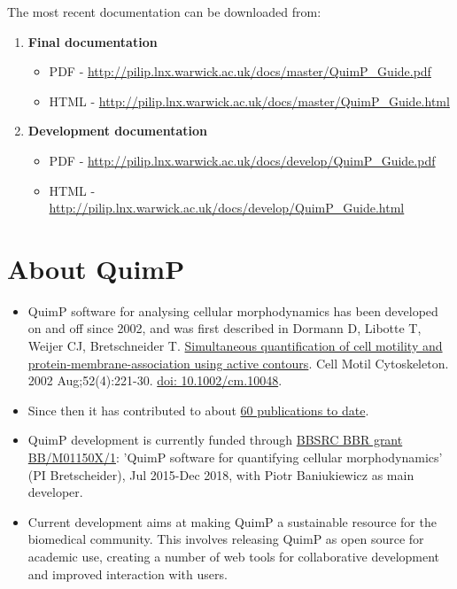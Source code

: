\documentclass[a4paper,12pt]{article}
\begin{document}
The most recent documentation can be downloaded from:
\begin{enumerate}
	\item \textbf{Final documentation}
	\begin{itemize}
		\item PDF - \url{http://pilip.lnx.warwick.ac.uk/docs/master/QuimP_Guide.pdf}
		\item HTML - \url{http://pilip.lnx.warwick.ac.uk/docs/master/QuimP_Guide.html}
	\end{itemize}
	\item \textbf{Development documentation}
	\begin{itemize}
		\item PDF - \url{http://pilip.lnx.warwick.ac.uk/docs/develop/QuimP_Guide.pdf}
		\item HTML - \url{http://pilip.lnx.warwick.ac.uk/docs/develop/QuimP_Guide.html}
	\end{itemize}
\end{enumerate} 
\section{About QuimP}
	\begin{itemize}
	\item QuimP software for analysing cellular morphodynamics has been developed on and off since 2002, and was first described in
Dormann D, Libotte T, Weijer CJ, Bretschneider T. \href{https://www.ncbi.nlm.nih.gov/pubmed/12112136}{Simultaneous quantification of cell motility and protein-membrane-association using active contours}. Cell Motil Cytoskeleton. 2002 Aug;52(4):221-30. \href{http://dx.doi.org/10.1007/978-3-0348-8043-5_17}{doi: 10.1002/cm.10048}.
	\item Since then it has contributed to about \href{http://www2.warwick.ac.uk/fac/sci/systemsbiology/staff/baniukiewicz/quimp/quimp-refs/}{60 publications to date}.
	\item QuimP development is currently funded through \href{http://www.bbsrc.ac.uk/research/grants-search/AwardDetails/?FundingReference=BB/M01150X/1}{BBSRC BBR grant BB/M01150X/1}: 'QuimP software for quantifying cellular morphodynamics' (PI Bretscheider), Jul 2015-Dec 2018, with Piotr Baniukiewicz as main developer.
	\item Current development aims at making QuimP a sustainable resource for the biomedical community. This involves releasing QuimP as open source for academic use, creating a number of web tools for collaborative development and improved interaction with users.
	\end{itemize}
\end{document}
